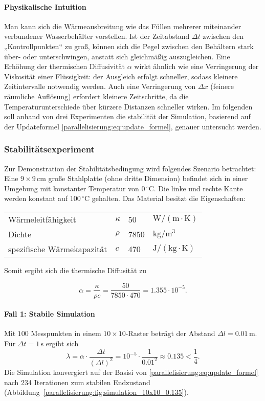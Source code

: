 \paragraph{Physikalische Intuition}  
Man kann sich die Wärmeausbreitung wie das Füllen mehrerer miteinander verbundener Wasserbehälter vorstellen.  
Ist der Zeitabstand \(\Delta t\) zwischen den „Kontrollpunkten“ zu groß, können sich die Pegel zwischen den Behältern stark über- oder unterschwingen, anstatt sich gleichmäßig auszugleichen.  
Eine Erhöhung der thermischen Diffusivität \(\alpha\) wirkt ähnlich wie eine Verringerung der Viskosität einer Flüssigkeit: der Ausgleich erfolgt schneller, sodass kleinere Zeitintervalle notwendig werden.  
Auch eine Verringerung von \(\Delta x\) (feinere räumliche Auflösung) erfordert kleinere Zeitschritte, da die Temperaturunterschiede über kürzere Distanzen schneller wirken.
Im folgenden soll anhand von drei Experimenten die stabilität der Simulation, basierend auf der Updateformel  \eqref{parallelisierung:eq:update_formel}, genauer untersucht werden.

\subsubsection{Stabilitätsexperiment}

Zur Demonstration der Stabilitätsbedingung wird folgendes Szenario betrachtet:
Eine \(9 \times 9 \, \mathrm{cm}\) große Stahlplatte (ohne dritte Dimension) befindet sich in einer Umgebung mit konstanter Temperatur von \(0\,^{\circ}\mathrm{C}\).  
Die linke und rechte Kante werden konstant auf \(100\,^{\circ}\mathrm{C}\) gehalten.  
Das Material besitzt die Eigenschaften:
\begin{center}
	\begin{tabular}{llll}
		Wärmeleitfähigkeit & \(\kappa\) & 50 &
		\(\mathrm{W/(m \cdot K)}\) \\
		Dichte & \(\rho\)   &  7850 & \(\mathrm{kg/m^3}\) \\
		spezifische Wärmekapazität & \(c\) &  470 & \(\mathrm{J/(kg \cdot K)}\)
	\end{tabular}
\end{center}
Somit ergibt sich die thermische Diffusität zu


\[
\alpha =
\frac{\kappa}{\rho c}
=
\frac{50}{7850 \cdot 470}
= 1.355 \cdot 10^{-5}.
\]

\paragraph{Fall 1: Stabile Simulation}  
Mit \(100\) Messpunkten in einem \(10\times 10\)-Raster beträgt der Abstand \(\Delta l = 0.01\,\mathrm{m}\).  
Für \(\Delta t = 1\,\mathrm{s}\) ergibt sich
\[
\lambda =
\alpha \cdot \frac{\Delta t}{(\Delta l)^2}
=
10^{-5} \cdot \frac{1}{0.01^2}
\approx 0.135 < \frac14.
\]
Die Simulation konvergiert auf der Basisi von \eqref{parallelisierung:eq:update_formel} nach 234 Iterationen zum stabilen Endzustand (Abbildung~\ref{parallelisierung:fig:simulation_10x10_0.135}).

